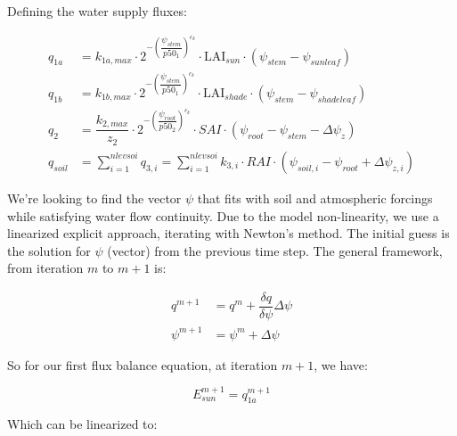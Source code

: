 \documentclass[draft,linenumbers]{agujournal}
\begin{document}
Defining the water supply fluxes:

   \begin{linenomath*} \begin{equation}
   \begin{aligned}
   q_{1a}&=k_{1a,max}\cdot 2^{-\left(\dfrac{\psi_{stem}}{p50_1}\right)^{c_k}} \cdot\mbox{LAI}_{sun}\cdot\left(\psi_{stem}-\psi_{sunleaf} \right) \\
   q_{1b}&=k_{1b,max}\cdot 2^{-\left(\dfrac{\psi_{stem}}{p50_1}\right)^{c_k}}\cdot\mbox{LAI}_{shade}\cdot\left(\psi_{stem}-\psi_{shadeleaf} \right) \\
   q_2&=\dfrac{k_{2,max}}{z_2} \cdot 2^{-\left(\dfrac{\psi_{root}}{p50_2}\right)^{c_k}} \cdot SAI \cdot \left( \psi_{root} - \psi_{stem} - \Delta \psi_z  \right) \\
   q_{soil}&=\sum_{i=1}^{nlevsoi}{q_{3,i}}=\sum_{i=1}^{nlevsoi}{k_{3,i}\cdot RAI\cdot\left(\psi_{soil,i}-\psi_{root} + \Delta\psi_{z,i} \right)}
   \end{aligned}
   \end{equation} \end{linenomath*}

We're looking to find the vector $\psi$
that fits with soil and atmospheric forcings while satisfying water flow continuity. 
Due to the model non-linearity, we use a linearized explicit approach, iterating with Newton's method. 
The initial guess is the solution for $\psi$ (vector) from the previous time step. 
The general framework, from iteration $m$ to $m+1$ is:

   \begin{linenomath*} \begin{equation} 
   \begin{aligned}
   q^{m+1}&=q^m+\dfrac{\delta q}{\delta\psi}\Delta\psi \\
   \psi^{m+1}&=\psi^{m}+\Delta\psi
   \end{aligned}
   \end{equation} \end{linenomath*}

So for our first flux balance equation, at iteration $m+1$, we have:

   \begin{linenomath*} \begin{equation} 
   E_{sun}^{m+1}=q_{1a}^{m+1}
   \end{equation} \end{linenomath*}

Which can be linearized to:
\end{document}
